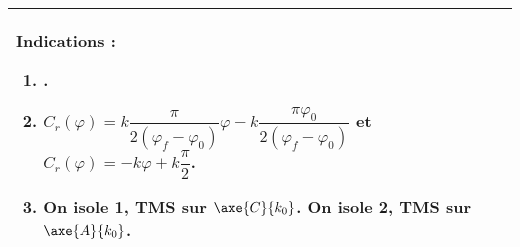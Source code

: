 \ifprof
\else
\ifcolle
\else
\footnotesize
\begin{marginfigure}
\begin{tabular}{|p{.9\linewidth}|}
\hline
Indications :
\begin{enumerate}
\item .
\item $C_r(\varphi)= k \dfrac{\pi}{2 \left(\varphi_f  -\varphi_0\right)}\varphi - k \dfrac{\pi \varphi_0}{2 \left(\varphi_f  -\varphi_0\right)} $ et 
$C_r(\varphi)= -k \varphi + k \dfrac{\pi}{2} $.
\item On isole 1, TMS sur $\axe{C}{k_0}$. On isole 2, TMS sur $\axe{A}{k_0}$.
\end{enumerate} \\ \hline
\end{tabular}
\end{marginfigure}
\normalsize
\fi



\fi
